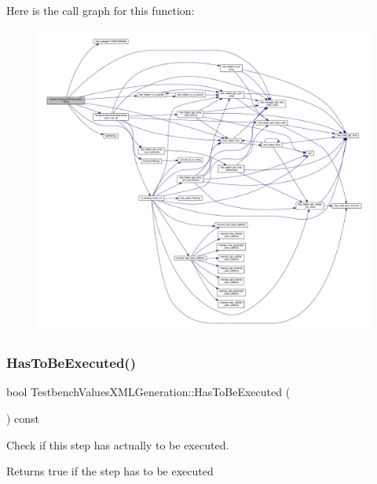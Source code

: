 Here is the call graph for this function\+:
\nopagebreak
\begin{figure}[H]
\begin{center}
\leavevmode
\includegraphics[width=350pt]{d5/d53/classTestbenchValuesXMLGeneration_afbcc1f49fabb5fa9cf4c4aaa15acba75_cgraph}
\end{center}
\end{figure}
\mbox{\label{classTestbenchValuesXMLGeneration_ad4f4aed7d1ff36657d084de85e3ee717}} 
\subsubsection{\texorpdfstring{Has\+To\+Be\+Executed()}{HasToBeExecuted()}}
{\footnotesize\ttfamily bool Testbench\+Values\+X\+M\+L\+Generation\+::\+Has\+To\+Be\+Executed (\begin{DoxyParamCaption}{ }\end{DoxyParamCaption}) const\hspace{0.3cm}{\ttfamily [virtual]}}



Check if this step has actually to be executed. 

\begin{DoxyReturn}{Returns}
true if the step has to be executed 
\end{DoxyReturn}


